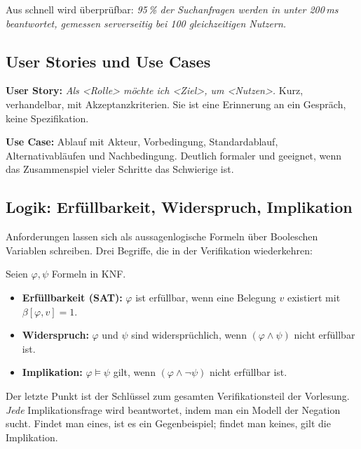 \documentclass[12pt, a4paper]{article}
\begin{document}
Aus \glqq{}schnell\grqq{} wird überprüfbar: \emph{95\,\% der Suchanfragen werden in
unter 200\,ms beantwortet, gemessen serverseitig bei 100 gleichzeitigen Nutzern.}

\subsection{User Stories und Use Cases}

\textbf{User Story:} \emph{Als \textless{}Rolle\textgreater{} möchte ich
\textless{}Ziel\textgreater{}, um \textless{}Nutzen\textgreater{}.}
Kurz, verhandelbar, mit Akzeptanzkriterien. Sie ist eine Erinnerung an ein Gespräch,
keine Spezifikation.

\textbf{Use Case:} Ablauf mit Akteur, Vorbedingung, Standardablauf, Alternativabläufen
und Nachbedingung. Deutlich formaler und geeignet, wenn das Zusammenspiel vieler
Schritte das Schwierige ist.

\subsection{Logik: Erfüllbarkeit, Widerspruch, Implikation}
\label{sec:logik}

Anforderungen lassen sich als aussagenlogische Formeln über Booleschen Variablen
schreiben. Drei Begriffe, die in der Verifikation wiederkehren:

\begin{definitionbox}
Seien $\varphi, \psi$ Formeln in KNF.
\begin{itemize}
  \item \textbf{Erfüllbarkeit (SAT):} $\varphi$ ist erfüllbar, wenn eine Belegung
        $v$ existiert mit $\beta[\varphi, v] = 1$.
  \item \textbf{Widerspruch:} $\varphi$ und $\psi$ sind widersprüchlich, wenn
        $(\varphi \wedge \psi)$ nicht erfüllbar ist.
  \item \textbf{Implikation:} $\varphi \models \psi$ gilt, wenn
        $(\varphi \wedge \neg\psi)$ nicht erfüllbar ist.
\end{itemize}
\end{definitionbox}

\begin{notebox}
Der letzte Punkt ist der Schlüssel zum gesamten Verifikationsteil der Vorlesung.
\emph{Jede} Implikationsfrage wird beantwortet, indem man ein Modell der Negation
sucht. Findet man eines, ist es ein Gegenbeispiel; findet man keines, gilt die
Implikation.
\end{notebox}
\end{document}

